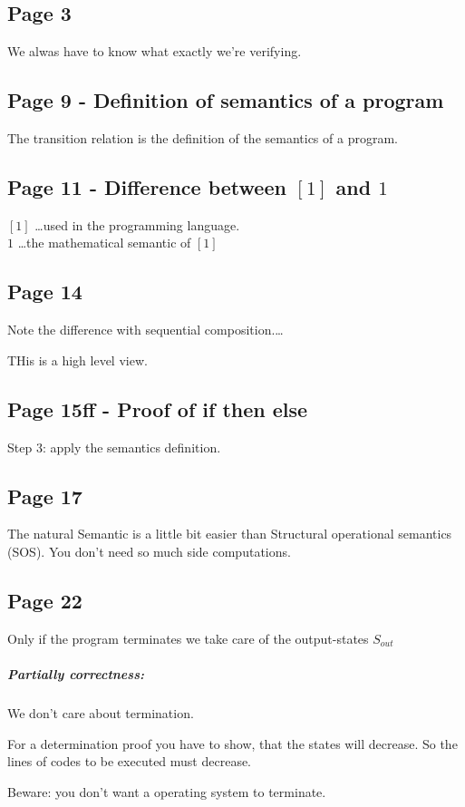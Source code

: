 \documentclass[a4paper]{article}
\begin{document}
\subsection{Page 3}
We alwas have to know what exactly we're verifying.

\subsection{Page 9 - Definition of semantics of a program}
The transition relation is the definition of the semantics of a program.

\subsection{Page 11 - Difference between $[1]$ and $1$}
$[1]$ \ldots used in the programming language.\\
$1$ \ldots the mathematical semantic of $[1]$

\subsection{Page 14}
Note the difference with sequential composition.\ldots

THis is a high level view.

\subsection{Page 15ff - Proof of if then else}
Step 3: apply the semantics definition.


\subsection{Page 17}
The natural Semantic is a little bit easier than Structural operational
semantics (SOS). You don't need so much side computations.

\subsection{Page 22}
Only if the program terminates we take care of the output-states $S_{out}$

\subparagraph{Partially correctness:} We don't care about termination.

For a determination proof you have to show, that the states will decrease. So
the lines of codes to be executed must decrease.

Beware: you don't want a operating system to terminate.
\end{document}
